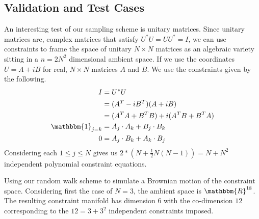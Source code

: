 
\subsection{Validation and Test Cases}

An interesting test of our sampling scheme is unitary matrices. Since unitary matrices are, complex matrices that satisfy $U^*U = UU^* = I$, we can use constraints to frame the space of unitary $N \times N$ matrices as an algebraic variety sitting in a $n = 2N^2$ dimensional ambient space. If we use the coordinates $U = A + iB$ for real, $N \times N$ matrices $A$ and $B$. We use the constraints given by the following. 
\begin{align}
I &= U^*U \\
&= (A^T - iB^T)(A + iB) \\
&= (A^TA + B^TB) + i(A^TB + B^TA) \\
\mathbbm{1}_{j=k} &= A_j\cdot A_k + B_j\cdot B_k \\
0 &= A_j\cdot B_k + A_k \cdot B_j 
\end{align}
Considering each $1 \leq j \leq N$ gives us $2*(N + \frac{1}{2}N(N-1)) = N + N^2$ independent polynomial constraint equations. 


Using our random walk scheme to simulate a Brownian motion of the constraint space. Considering first the case of $N = 3$, the ambient space is $\mathbbm{R}^{18}$. The resulting constraint manifold has dimension $6$ with the co-dimension $12$ corresponding to the $12 = 3 + 3^2$ independent constraints imposed.  

